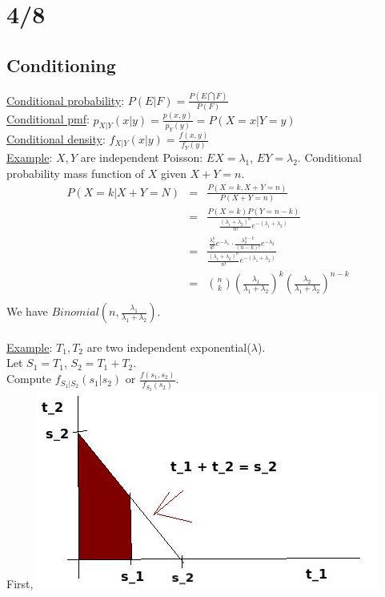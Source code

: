 \section*{4/8}
  \subsection*{Conditioning}
    \underline{Conditional probability}: $P(E|F) = \frac{P(E\bigcap F)}{P(F)}$\\
    \underline{Conditional pmf}: $p_{X|Y}(x|y) = \frac{p(x,y)}{p_Y(y)} = P(X=x|Y=y)$\\
    \underline{Conditional density}: $f_{X|Y}(x|y) = \frac{f(x,y)}{f_Y(y)}$\\

    \noindent\underline{Example}: $X,Y$ are independent Poisson: $EX= \lambda_1$, 
      $EY = \lambda_2$. Conditional probability mass function of $X$ given
      $X+Y = n$.\\
      \begin{eqnarray*}
        P(X = k| X+Y = N) & = & \frac{P(X = k, X+Y = n)}{P(X+Y = n)}\\
        & = & \frac{P(X= k)P(Y = n-k)}{\frac{(\lambda_1 + \lambda_2)^n}{n!}
          e^{-(\lambda_1 + \lambda_2)}}\\
        & = & \frac{\frac{\lambda_1^k}{k!} e^{-\lambda_1} 
              \cdot \frac{\lambda_2^{n-k}}{(n-k)!} e^{-\lambda_2}}
          {\frac{(\lambda_1 + \lambda_2)^n}{n!} e^{-(\lambda_1 + \lambda_2)}}\\
        & = & \binom{n}{k} \left(\frac{\lambda_1}{\lambda_1 + \lambda_2}\right)^k
          \left(\frac{\lambda_2}{\lambda_1 + \lambda_2}\right)^{n-k}\\
      \end{eqnarray*}
      We have $Binomial(n, \frac{\lambda_1}{\lambda_1 + \lambda_2})$.\\\\
    \underline{Example}: $T_1, T_2$ are two independent exponential($\lambda$).\\
    Let $S_1 = T_1$, $S_2 = T_1 + T_2$.\\
    Compute $f_{S_1|S_2}(s_1 | s_2)$ or $\frac{f(s_1, s_2)}{f_{S_2}(s_2)}$.\\
    First,
    \includegraphics{4_8.jpeg}
